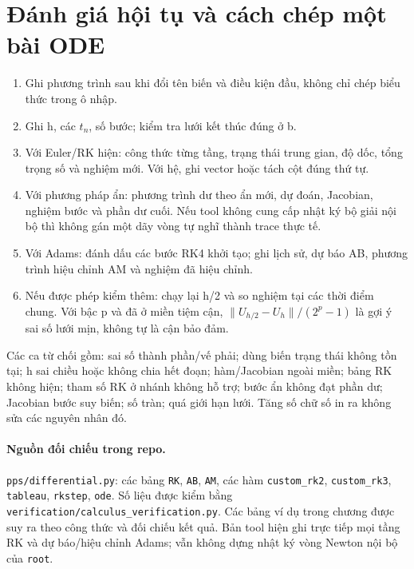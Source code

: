 \section{Đánh giá hội tụ và cách chép một bài ODE}
\begin{enumerate}
\item Ghi phương trình sau khi đổi tên biến và điều kiện đầu, không chỉ chép biểu thức trong ô nhập.
\item Ghi h, các $t_n$, số bước; kiểm tra lưới kết thúc đúng ở b.
\item Với Euler/RK hiện: công thức từng tầng, trạng thái trung gian, độ dốc, tổng trọng số và nghiệm mới. Với hệ, ghi vector hoặc tách cột đúng thứ tự.
\item Với phương pháp ẩn: phương trình dư theo ẩn mới, dự đoán, Jacobian, nghiệm bước và phần dư cuối. Nếu tool không cung cấp nhật ký bộ giải nội bộ thì không gán một dãy vòng tự nghĩ thành trace thực tế.
\item Với Adams: đánh dấu các bước RK4 khởi tạo; ghi lịch sử, dự báo AB, phương trình hiệu chỉnh AM và nghiệm đã hiệu chỉnh.
\item Nếu được phép kiểm thêm: chạy lại h/2 và so nghiệm tại các thời điểm chung. Với bậc p và đã ở miền tiệm cận, $\|U_{h/2}-U_h\|/(2^p-1)$ là gợi ý sai số lưới mịn, không tự là cận bảo đảm.
\end{enumerate}
Các ca từ chối gồm: sai số thành phần/vế phải; dùng biến trạng thái không tồn tại; h sai chiều hoặc không chia hết đoạn; hàm/Jacobian ngoài miền; bảng RK không hiện; tham số RK ở nhánh không hỗ trợ; bước ẩn không đạt phần dư; Jacobian bước suy biến; số tràn; quá giới hạn lưới. Tăng số chữ số in ra không sửa các nguyên nhân đó.

\paragraph{Nguồn đối chiếu trong repo.} \texttt{pps/differential.py}: các bảng \texttt{RK}, \texttt{AB}, \texttt{AM}, các hàm \texttt{custom\_rk2}, \texttt{custom\_rk3}, \texttt{tableau}, \texttt{rkstep}, \texttt{ode}. Số liệu được kiểm bằng \texttt{verification/calculus\_verification.py}. Các bảng ví dụ trong chương được suy ra theo công thức và đối chiếu kết quả. Bản tool hiện ghi trực tiếp mọi tầng RK và dự báo/hiệu chỉnh Adams; vẫn không dựng nhật ký vòng Newton nội bộ của \texttt{root}.
